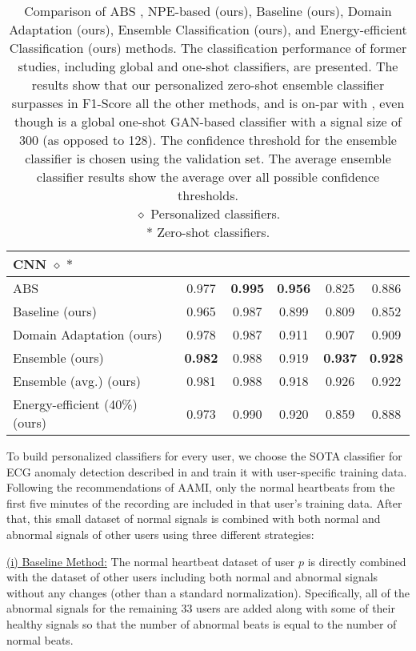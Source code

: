 \documentclass[journal,transmag]{IEEEtran}
\begin{document}
\begin{table*}[!htbp]
{{\begin{tabular}{lccccc}
    \hline
    \multicolumn{6}{l}{\textbf{CNN} $\diamond\,*$} \\
    \hline
    ABS \cite{kiranyaz2017personalized} & 0.977 & \textbf{0.995} & \textbf{0.956} & 0.825 & 0.886 \\
    Baseline (ours) & 0.965 & 0.987 & 0.899 & 0.809 & 0.852 \\
    Domain Adaptation (ours) & 0.978 & 0.987 & 0.911 & 0.907 & 0.909 \\
    Ensemble (ours) & \textbf{0.982} & 0.988 & 0.919 & \textbf{0.937} & \textbf{0.928} \\
    Ensemble (avg.) (ours) & 0.981 & 0.988 & 0.918 & 0.926 & 0.922 \\
    Energy-efficient (40\%) (ours) & 0.973 & 0.990 & 0.920 & 0.859 & 0.888 \\
    \hline
    \end{tabular}}
    }
    \caption{Comparison of ABS \cite{kiranyaz2017personalized}, NPE-based (ours), Baseline (ours), Domain Adaptation (ours), Ensemble Classification (ours), and Energy-efficient Classification (ours) methods. The classification performance of former studies, including global and one-shot classifiers, are presented. The results show that our personalized zero-shot ensemble classifier surpasses in F1-Score all the other methods, and is on-par with \cite{shaker2020generalization}, even though \cite{shaker2020generalization} is a global one-shot GAN-based classifier with a signal size of 300 (as opposed to 128). The confidence threshold for the ensemble classifier is chosen using the validation set. The average ensemble classifier results show the average over all possible confidence thresholds. \\
    $\diamond$ Personalized classifiers. \\
    * Zero-shot classifiers. }
    \label{tab:comparison_others}
\end{table*}

To build personalized classifiers for every user, we choose the SOTA classifier for ECG anomaly detection described in \cite{kiranyaz2017personalized} and train it with user-specific training data. Following the recommendations of AAMI, only the normal heartbeats from the first five minutes of the recording are included in that user's training data. After that, this small dataset of normal signals is combined with both normal and abnormal signals of other users using three different strategies: 

\underline{(i) Baseline Method:} The normal heartbeat dataset of user $p$ is directly combined with the dataset of other users including both normal and abnormal signals without any changes (other than a standard normalization). Specifically, all of the abnormal signals for the remaining 33 users are added along with some of their healthy signals so that the number of abnormal beats is equal to the number of normal beats.
\end{document}
